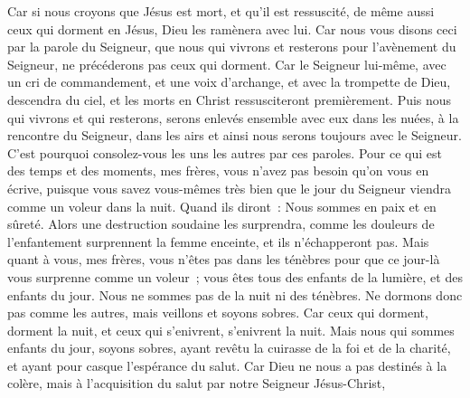 \begin{multicols}{2}
Car si nous croyons que Jésus est mort, et qu'il est ressuscité, de même aussi ceux qui dorment en Jésus, Dieu les ramènera avec lui.
Car nous vous disons ceci par la parole du Seigneur, que nous qui vivrons et resterons pour l'avènement du Seigneur, ne précéderons pas ceux qui dorment.
Car le Seigneur lui-même, avec un cri de commandement, et une voix d'archange, et avec la trompette de Dieu, descendra du ciel, et les morts en Christ ressusciteront premièrement.
Puis nous qui vivrons et qui resterons, serons enlevés ensemble avec eux dans les nuées, à la rencontre du Seigneur, dans les airs et ainsi nous serons toujours avec le Seigneur. 
C'est pourquoi consolez-vous les uns les autres par ces paroles.
\VerseOne{}Pour ce qui est des temps et des moments, mes frères, vous n'avez pas besoin qu'on vous en écrive,
puisque vous savez vous-mêmes très bien que le jour du Seigneur viendra comme un voleur dans la nuit.
Quand ils diront~: Nous sommes en paix et en sûreté. Alors une destruction soudaine les surprendra, comme les douleurs de l'enfantement surprennent la femme enceinte, et ils n'échapperont pas.
Mais quant à vous, mes frères, vous n'êtes pas dans les ténèbres pour que ce jour-là vous surprenne comme un voleur~;
vous êtes tous des enfants de la lumière, et des enfants du jour. Nous ne sommes pas de la nuit ni des ténèbres.
Ne dormons donc pas comme les autres, mais veillons et soyons sobres.
Car ceux qui dorment, dorment la nuit, et ceux qui s'enivrent, s'enivrent la nuit.
Mais nous qui sommes enfants du jour, soyons sobres, ayant revêtu la cuirasse de la foi et de la charité, et ayant pour casque l'espérance du salut.
Car Dieu ne nous a pas destinés à la colère, mais à l'acquisition du salut par notre Seigneur Jésus-Christ,

\end{multicols}
